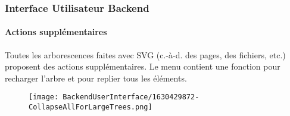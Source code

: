 %

\begin{frame}[fragile]
	\frametitle{Interface Utilisateur Backend}
	\framesubtitle{Actions supplémentaires}

	Toutes les arborescences faites avec SVG (c.-à-d. des pages, des fichiers, etc.) proposent
	des actions supplémentaires. Le menu contient une fonction pour recharger l'arbre et
	pour replier tous les éléments.

	\begin{figure}
		\texttt{[image: BackendUserInterface/1630429872-CollapseAllForLargeTrees.png]}
	\end{figure}

\end{frame}

